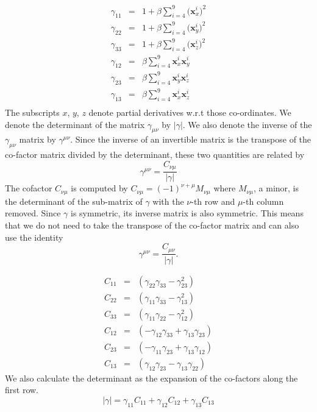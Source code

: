 \documentclass[12pt]{article}
\newcommand{\vect}[1]{\mathbf{#1}}
\begin{document}
\begin{eqnarray*}
\gamma_{1 1} & = & 1 + \beta \sum_{i=4}^9 
  \big(\vect{x}^i_x\big)^2 \\
\gamma_{2 2} &=& 1 + \beta \sum_{i=4}^9 
  \big(\vect{x}^i_y\big)^2 \\
\gamma_{3 3} &=& 1 + \beta \sum_{i=4}^9 
  \big(\vect{x}^i_z\big)^2 \\
\gamma_{1 2} &=& \beta \sum_{i=4}^9 \vect{x}^i_x  \vect{x}^i_y  \\
\gamma_{2 3} &=& \beta \sum_{i=4}^9 \vect{x}^i_y \vect{x}^i_z  \\
\gamma_{1 3} &=& \beta \sum_{i=4}^9 \vect{x}^i_x \vect{x}^i_z  \\
\end{eqnarray*}
The subscripts $x$, $y$, $z$ denote partial derivatives w.r.t those co-ordinates.
We denote the determinant of the matrix $\gamma_{\mu \nu}$ by $|\gamma|$. We
also denote the inverse of the $\gamma_{\mu \nu}$ matrix by $\gamma^{\mu \nu}$.
Since the inverse of an invertible matrix is the transpose of the co-factor
matrix divided by the determinant, these two quantities are related by 
$$\gamma^{\mu \nu} = \frac{C_{\nu \mu}}{|\gamma|}$$
The cofactor $C_{\nu \mu}$ is computed by $C_{\nu \mu} = (-1)^{\nu + \mu}
M_{\nu \mu}$ where $M_{\nu \mu}$, a minor, is the determinant of the sub-matrix
of $\gamma$ with the $\nu$-th row and $\mu$-th column removed. Since $\gamma$
is symmetric, its inverse matrix is also symmetric. This means that we do not
need to take the transpose of the co-factor matrix and can also use the
identity $$\gamma^{\mu \nu} = \frac{C_{\mu \nu}}{|\gamma|}.$$

\begin{eqnarray*}
C_{1 1} &=&  (\gamma_{2 2} \gamma_{3 3} - \gamma_{2 3}^2) \\
C_{2 2} &=&  (\gamma_{1 1} \gamma_{3 3} - \gamma_{1 3}^2) \\
C_{3 3} &=&  (\gamma_{1 1} \gamma_{2 2} - \gamma_{1 2}^2) \\
C_{1 2} &=& (-\gamma_{1 2} \gamma_{3 3} + \gamma_{1 3} \gamma_{2 3}) \\
C_{2 3} &=& (-\gamma_{1 1} \gamma_{2 3} + \gamma_{1 3} \gamma_{1 2}) \\
C_{1 3} &=&  (\gamma_{1 2} \gamma_{2 3} - \gamma_{1 3} \gamma_{2 2}) 
\end{eqnarray*}
We also calculate the determinant as the expansion of the co-factors along the first row. 
$$|\gamma| = \gamma_{1 1} C_{1 1} + \gamma_{1 2} C_{1 2} + 
             \gamma_{1 3} C_{1 3}$$
\end{document}
